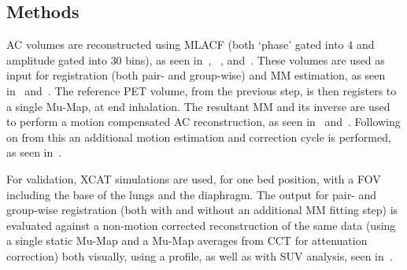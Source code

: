         \subsection{Methods} \label{sec:pet_ct_motion_correction_exploiting_motion_models_fit_on_coarsely_gated_data_applied_to_finely_gated_data_methods}
            \gls{AC} volumes are reconstructed using \gls{MLACF} (both `phase' gated into $4$ and amplitude gated into $30$ bins), as seen in~, ~, and~. These volumes are used as input for registration (both pair- and group-wise) and \gls{MM} estimation, as seen in~ and~. The reference \gls{PET} volume, from the previous step, is then registers to a single \gls{Mu-Map}, at end inhalation. The resultant \gls{MM} and its inverse are used to perform a motion compensated \gls{AC} reconstruction, as seen in~ and~. Following on from this an additional motion estimation and correction cycle is performed, as seen in~.
            
            For validation, \gls{XCAT} simulations are used, for one bed position, with a \gls{FOV} including the base of the lungs and the diaphragm. The output for pair- and group-wise registration (both with and without an additional \gls{MM} fitting step) is evaluated against a non-motion corrected reconstruction of the same data (using a single static \gls{Mu-Map} and a \gls{Mu-Map} averages from \gls{CCT} for attenuation correction) both visually, using a profile, as well as with \gls{SUV} analysis, seen in~.
            
